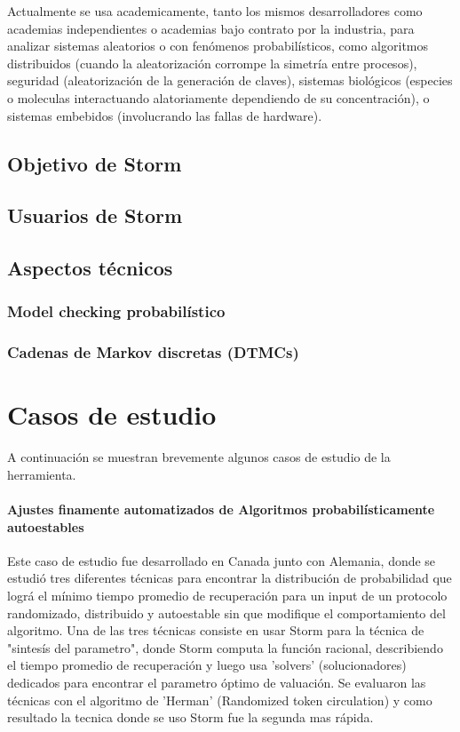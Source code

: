 \documentclass[11pt]{article}
\begin{document}
Actualmente se usa academicamente, tanto los mismos desarrolladores como academias independientes o academias bajo contrato por la industria, para analizar sistemas aleatorios o con fen\'omenos probabil\'isticos, como algoritmos distribuidos (cuando la aleatorizaci\'on corrompe la simetr\'ia entre procesos), seguridad (aleatorizaci\'on de la generaci\'on de claves), sistemas biol\'ogicos (especies o moleculas interactuando alatoriamente dependiendo de su concentraci\'on), o sistemas embebidos (involucrando las fallas de hardware). 

\subsection{Objetivo de Storm}

\subsection{Usuarios de Storm}

\subsection{Aspectos t\'ecnicos}

\subsubsection{Model checking probabil\'istico}

\subsubsection{Cadenas de Markov discretas (DTMCs)}

\section{Casos de estudio}

A continuaci\'on se muestran brevemente algunos casos de estudio de la herramienta.

\paragraph{Ajustes finamente automatizados de Algoritmos probabil\'isticamente autoestables}
Este caso de estudio fue desarrollado en Canada junto con Alemania, donde se estudi\'o tres diferentes t\'ecnicas para encontrar la distribuci\'on de probabilidad que logr\'a el m\'inimo tiempo promedio de recuperaci\'on para un input de un protocolo randomizado, distribuido y autoestable sin que modifique el comportamiento del algoritmo. Una de las tres t\'ecnicas consiste en usar Storm para la t\'ecnica de "sintes\'is del parametro", donde Storm computa la funci\'on racional, describiendo el tiempo promedio de recuperaci\'on y luego usa 'solvers' (solucionadores) dedicados para encontrar el parametro \'optimo de valuaci\'on. Se evaluaron las t\'ecnicas con el algoritmo de 'Herman' (Randomized token circulation) y como resultado la tecnica donde se uso Storm fue la segunda mas r\'apida.
 
\end{document}
